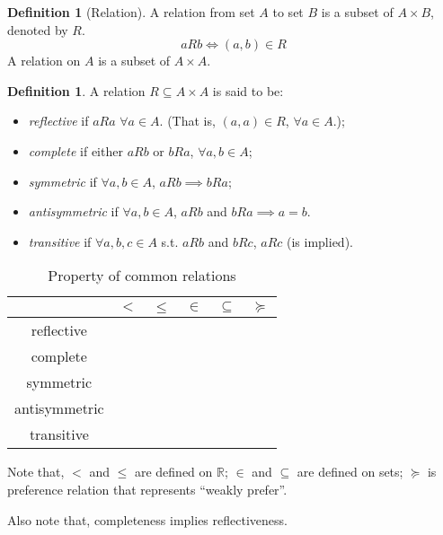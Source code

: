 \documentclass[12pt]{article}
\newcommand{\R}{{\mathbb R}}
\theoremstyle{definition}
\newtheorem{definition}[theorem]{Definition}
\theoremstyle{plain}
\newcommand{\cmark}{\ding{51}}%
\newcommand{\xmark}{\ding{55}}%
\begin{document}
\begin{definition}
    [Relation]
    A relation from set $A$ to set $B$ is a subset of $A\times B$, denoted by 
    $R$. 
    \[
        a R b \iff (a,b) \in R
    \]
    A relation on $A$ is a subset of $A \times A$.
\end{definition}

\begin{definition}
    A relation $R \subseteq A \times A$ is said to be: 
    \begin{itemize}
        \item \emph{reflective} if $a R a$ $\forall a \in A$. (That is, $(a,a) \in R 
            $, $\forall a \in A$.);

        \item \emph{complete} if either $aRb$ or $b R a$, $\forall a, b \in A$;

        \item \emph{symmetric} if $\forall a, b \in A$, $aR b \implies b R a$;

        \item \emph{antisymmetric} if $\forall a, b \in A$, $a R b $ and $ b R a 
            \implies a = b$.

        \item \emph{transitive} if $\forall a,b,c \in A$ s.t. $aRb$ and $bRc$, 
            $aRc$ (is implied).
    \end{itemize}
\end{definition}

\begin{table}[htpl]
    \caption{Property of common relations}
    \bigskip
    \centering
    \begin{tabular}{c|c|c|c|c|c}
                        & $<$    & $\le$  & $\in$  & $\subseteq $ & $\succeq$ \\
          \hline
          reflective    & \xmark & \cmark & \xmark & \cmark       & \cmark    \\
          complete      & \xmark & \cmark & \xmark & \xmark       & \cmark    \\
          symmetric     & \xmark & \xmark & \xmark & \xmark       & \xmark    \\
          antisymmetric & \cmark & \cmark & \cmark & \cmark       & \xmark    \\
          transitive    & \cmark & \cmark & \xmark & \cmark       & \cmark
    \end{tabular}
\end{table}


Note that, $<$ and $\le$ are defined on $\R$; $\in$ and $\subseteq$ are 
defined on sets; $\succeq$ is preference relation that represents ``weakly 
prefer''.

Also note that, completeness implies reflectiveness.
\end{document}

